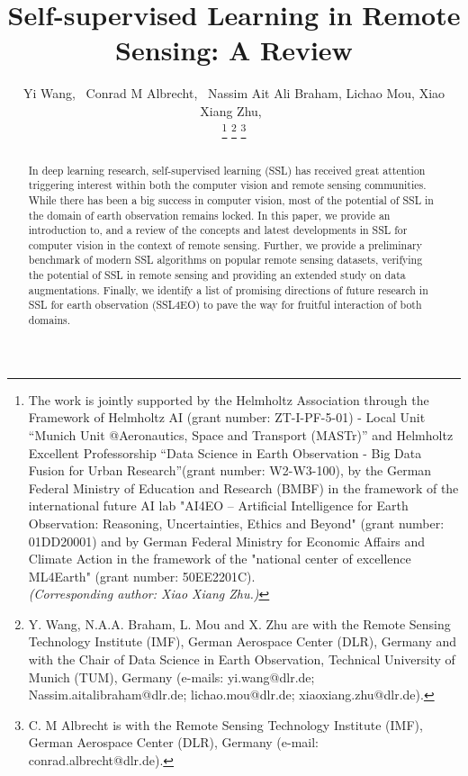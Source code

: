 \documentclass[lettersize,journal]{IEEEtran}
\begin{document}
\title{Self-supervised Learning in Remote Sensing: A Review}

\author{Yi Wang,~
Conrad M Albrecht,~
Nassim Ait Ali Braham, Lichao Mou,
Xiao Xiang Zhu,~

\thanks{The work is jointly supported by the Helmholtz Association
through the Framework of Helmholtz AI (grant  number:  ZT-I-PF-5-01) - Local Unit ``Munich Unit @Aeronautics, Space and Transport (MASTr)'' and Helmholtz Excellent Professorship ``Data Science in Earth Observation - Big Data Fusion for Urban Research''(grant number: W2-W3-100), by the German Federal Ministry of Education and Research (BMBF) in the framework of the international future AI lab "AI4EO -- Artificial Intelligence for Earth Observation: Reasoning, Uncertainties, Ethics and Beyond" (grant number: 01DD20001) and by German Federal Ministry for Economic Affairs and Climate Action in the framework of the "national center of excellence ML4Earth" (grant number: 50EE2201C). \\
\textit{(Corresponding author: Xiao Xiang Zhu.)}}
\thanks{Y. Wang, N.A.A. Braham, L. Mou and X. Zhu are with the Remote Sensing Technology Institute (IMF), German Aerospace Center (DLR), Germany and with the Chair of Data Science in Earth Observation, Technical University of Munich (TUM), Germany (e-mails: yi.wang@dlr.de; Nassim.aitalibraham@dlr.de; lichao.mou@dlr.de; xiaoxiang.zhu@dlr.de).}
\thanks{C. M Albrecht is with the Remote Sensing Technology Institute (IMF), German Aerospace Center (DLR), Germany (e-mail: conrad.albrecht@dlr.de).}

}







\maketitle
\begin{abstract}
In deep learning research, self-supervised learning (SSL) has received great attention triggering interest within both the computer vision and remote sensing communities. While there has been a big success in computer vision, most of the potential of SSL in the domain of earth observation remains locked. In this paper, we provide an introduction to, and a review of the concepts and latest developments in SSL for computer vision in the context of remote sensing. Further, we provide a preliminary benchmark of modern SSL algorithms on popular remote sensing datasets, verifying the potential of SSL in remote sensing and providing an extended study on data augmentations. Finally, we identify a list of promising directions of future research in SSL for earth observation (SSL4EO) to pave the way for fruitful interaction of both domains.
\end{abstract}
\end{document}
